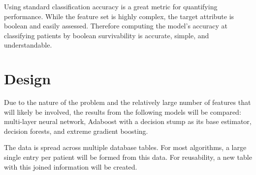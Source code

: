 \documentclass[11pt]{article}
\begin{document}
Using standard classification accuracy is a great metric for quantifying performance. While the feature set is highly complex, the target attribute is boolean and easily assessed. Therefore computing the model's accuracy at classifying patients by boolean survivability is accurate, simple, and understandable.

\section{Design}
Due to the nature of the problem and the relatively large number of features that will likely be involved, the results from the following models will be compared: multi-layer neural network, Adaboost with a decision stump as its base estimator, decision forests, and extreme gradient boosting.

The data is spread across multiple database tables. For most algorithms, a large single entry per patient will be formed from this data. For reusability, a new table with this joined information will be created.
\end{document}
